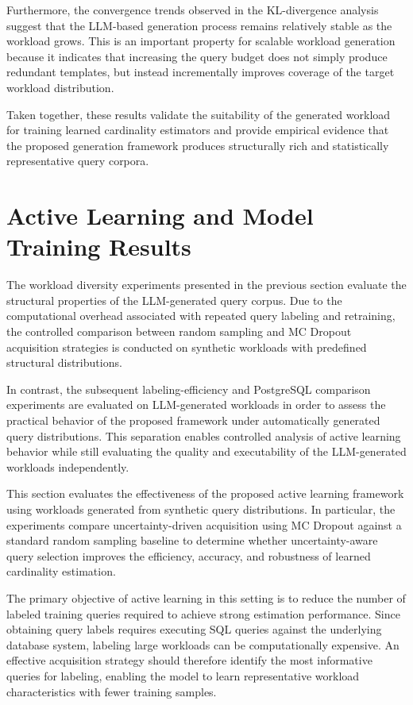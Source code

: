 Furthermore, the convergence trends observed in the KL-divergence analysis suggest that the LLM-based generation process remains relatively stable as the workload grows. This is an important property for scalable workload generation because it indicates that increasing the query budget does not simply produce redundant templates, but instead incrementally improves coverage of the target workload distribution.

Taken together, these results validate the suitability of the generated workload for training learned cardinality estimators and provide empirical evidence that the proposed generation framework produces structurally rich and statistically representative query corpora.

\section{Active Learning and Model Training Results}

The workload diversity experiments presented in the previous section evaluate the structural properties of the LLM-generated query corpus. Due to the computational overhead associated with repeated query labeling and retraining, the controlled comparison between random sampling and MC Dropout acquisition strategies is conducted on synthetic workloads with predefined structural distributions.

In contrast, the subsequent labeling-efficiency and PostgreSQL comparison experiments are evaluated on LLM-generated workloads in order to assess the practical behavior of the proposed framework under automatically generated query distributions. This separation enables controlled analysis of active learning behavior while still evaluating the quality and executability of the LLM-generated workloads independently.

This section evaluates the effectiveness of the proposed active learning framework using workloads generated from synthetic query distributions. In particular, the experiments compare uncertainty-driven acquisition using MC Dropout against a standard random sampling baseline to determine whether uncertainty-aware query selection improves the efficiency, accuracy, and robustness of learned cardinality estimation.

The primary objective of active learning in this setting is to reduce the number of labeled training queries required to achieve strong estimation performance. Since obtaining query labels requires executing SQL queries against the underlying database system, labeling large workloads can be computationally expensive. An effective acquisition strategy should therefore identify the most informative queries for labeling, enabling the model to learn representative workload characteristics with fewer training samples.

